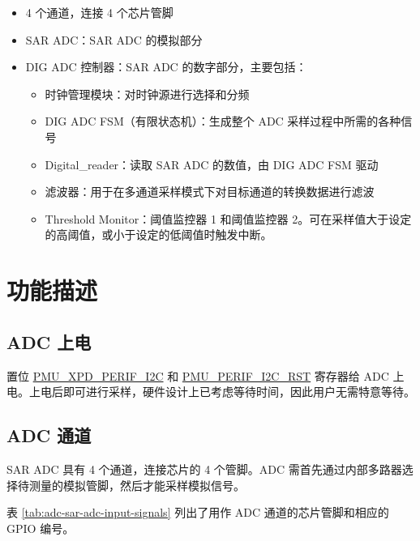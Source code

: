 \documentclass[main\_\_CN.tex]{subfiles}
\begin{document}
\begin{itemize}
    \item 4 个通道，连接 4 个芯片管脚
    \item SAR ADC：SAR ADC 的模拟部分
    \item DIG ADC 控制器：SAR ADC 的数字部分，主要包括：
    \begin{itemize}
        \item 时钟管理模块：对时钟源进行选择和分频
        \item DIG ADC FSM（有限状态机）：生成整个 ADC 采样过程中所需的各种信号
        \item Digital\_reader：读取 SAR ADC 的数值，由 DIG ADC FSM 驱动
        \item 滤波器：用于在多通道采样模式下对目标通道的转换数据进行滤波
        \item Threshold Monitor：阈值监控器 1 和阈值监控器 2。可在采样值大于设定的高阈值，或小于设定的低阈值时触发中断。
    \end{itemize}
\end{itemize}



\section{功能描述}
\label{sec:sar-adc-func-descr}

\subsection{ADC 上电}
\label{sec:sar-adc-power-up}

置位 \hyperref[fielddesc:PMUXPDPERIFI2C]{PMU\_XPD\_PERIF\_I2C} 和 \hyperref[fielddesc:PMUPERIFI2CRST]{PMU\_PERIF\_I2C\_RST} 寄存器给 ADC 上电。上电后即可进行采样，硬件设计上已考虑等待时间，因此用户无需特意等待。
\subsection{ADC 通道}
\label{sec:sar-adc-channels}

SAR ADC 具有 4 个通道，连接芯片的 4 个管脚。ADC 需首先通过内部多路器选择待测量的模拟管脚，然后才能采样模拟信号。

表 \ref{tab:adc-sar-adc-input-signals} 列出了用作 ADC 通道的芯片管脚和相应的 GPIO 编号。
\end{document}
